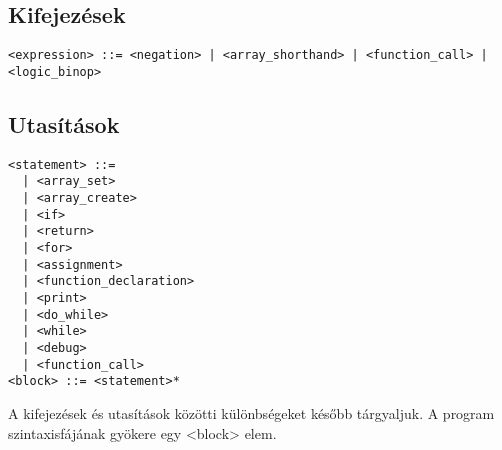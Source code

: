 \subsection{Kifejezések}

\begin{footnotesize}
\begin{verbatim}
<expression> ::= <negation> | <array_shorthand> | <function_call> | <logic_binop>
\end{verbatim}
\end{footnotesize}

\subsection{Utasítások}

\begin{footnotesize}
\begin{verbatim}
<statement> ::= 
  | <array_set> 
  | <array_create> 
  | <if> 
  | <return> 
  | <for> 
  | <assignment> 
  | <function_declaration> 
  | <print> 
  | <do_while> 
  | <while> 
  | <debug> 
  | <function_call>
<block> ::= <statement>*
\end{verbatim}
\end{footnotesize}

A kifejezések és utasítások közötti különbségeket később tárgyaljuk. A program szintaxisfájának gyökere egy <block> elem.
